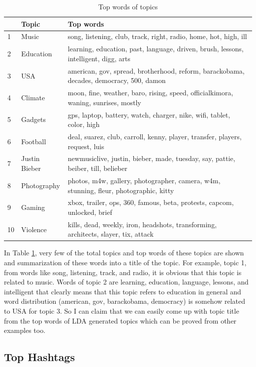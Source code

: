 \documentclass[a4paper]{report}
\begin{document}
\begin{table}[!ht]
\begin{tabular}{|p{0.5cm}|p{2.5cm}|p{10.5cm}|}
\hline  & \bf Topic & \bf Top words \\ \hline
1 & Music & song, listening, club, track, right, radio, home, hot, high, ill  \\ \hline
2 & Education & learning, education, past, language, driven, brush, lessons, intelligent, digg, arts \\ \hline
3 & USA & american, gov, spread, brotherhood, reform, barackobama, decades, democracy, 500, damon \\ \hline
4 & Climate & moon, fine, weather, baro, rising, speed, officialkimora, waning, sunrises, mostly \\ \hline
5 & Gadgets & gps, laptop, battery, watch, charger, nike, wifi, tablet, color, high \\ \hline
6 & Football & deal, suarez, club, carroll, kenny, player, transfer, players, request, luis \\ \hline
7 & Justin Bieber & newmusiclive, justin, bieber, made, tuesday, say, pattie, beiber, till, belieber \\ \hline
8 & Photography & photos, m4w, gallery, photographer, camera, w4m, stunning, fleur, photographic, kitty\\ \hline
9 & Gaming & xbox, trailer, ops, 360, famous, beta, protests, capcom, unlocked, brief \\ \hline
10 & Violence & kills, dead, weekly, iron, headshots, transforming, architects, slayer, tix, attack \\ \hline
\end{tabular}
\caption{Top words of topics}
\label{table:topic-word}
\end{table}

In Table \ref{table:topic-word}, very few of the total topics and top words of these topics are shown and summarization of these words into a title of the topic. For example, topic 1, from words like song, listening, track, and radio, it is obvious that this topic is related to music. Words of topic 2 are learning, education, language, lessons, and intelligent that clearly means that this topic refers to education in general and word distribution (american, gov, barackobama, democracy) is somehow related to USA for topic 3. So I can claim that we can easily come up with topic title from the top words of LDA generated topics which can be proved from other examples too. 

\subsection{Top Hashtags}
\end{document}
